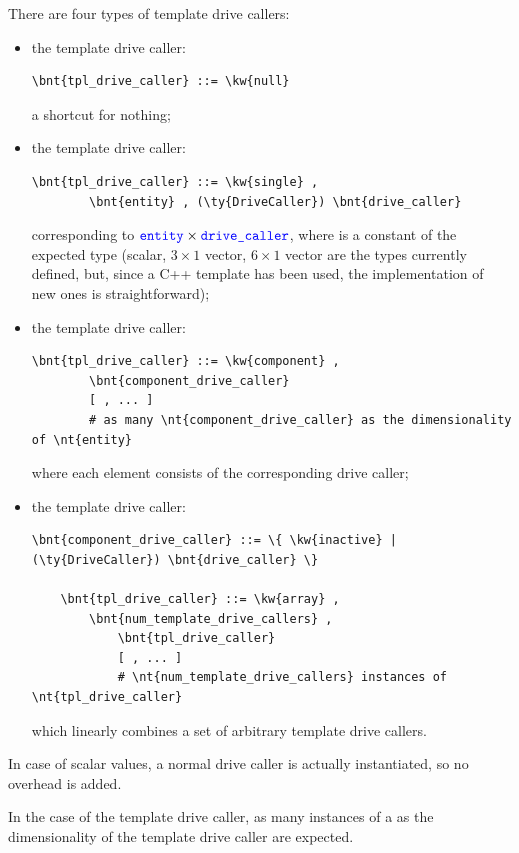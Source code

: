 There are four types of template drive callers:
\begin{itemize}
\item the  template drive caller:
\begin{Verbatim}[commandchars=\\\{\}]
    \bnt{tpl_drive_caller} ::= \kw{null}
\end{Verbatim}
a shortcut for nothing;
\item the  template drive caller:
\begin{Verbatim}[commandchars=\\\{\}]
    \bnt{tpl_drive_caller} ::= \kw{single} ,
        \bnt{entity} , (\ty{DriveCaller}) \bnt{drive_caller}
\end{Verbatim}
corresponding to $\textcolor{blue}{\texttt{entity}}\times\textcolor{blue}{\texttt{drive\_caller}}$,
where  is a constant of the expected type (scalar, $3 \times 1$ 
vector, $6 \times 1$ vector are the types currently defined, but, since 
a C++ template has been used, the implementation of new ones 
is straightforward);

\item the  template drive caller:
\begin{Verbatim}[commandchars=\\\{\}]
    \bnt{tpl_drive_caller} ::= \kw{component} ,
        \bnt{component_drive_caller}
        [ , ... ]
        # as many \nt{component_drive_caller} as the dimensionality of \nt{entity}
\end{Verbatim}
where each element consists of the corresponding drive caller;

\item the  template drive caller:
\begin{Verbatim}[commandchars=\\\{\}]
    \bnt{component_drive_caller} ::= \{ \kw{inactive} | (\ty{DriveCaller}) \bnt{drive_caller} \}

    \bnt{tpl_drive_caller} ::= \kw{array} ,
        \bnt{num_template_drive_callers} ,
            \bnt{tpl_drive_caller}
            [ , ... ]
            # \nt{num_template_drive_callers} instances of \nt{tpl_drive_caller}
\end{Verbatim}
which linearly combines a set of arbitrary template drive callers.
\end{itemize}
In case of scalar values, a normal drive caller is actually instantiated,
so no overhead is added.

In the case of the  template drive caller,
as many instances of a  as the dimensionality
of the template drive caller are expected.

